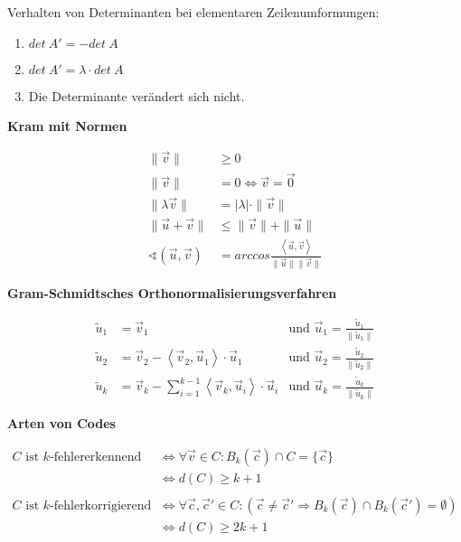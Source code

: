 \documentclass[10pt,fleqn, a4paper]{article}
\begin{document}
Verhalten von Determinanten bei elementaren Zeilenumformungen:

\begin{enumerate}
\item $det\ A'=-det\ A$
\item $det\ A'=\lambda\cdot det\ A$
\item Die Determinante verändert sich nicht.
\end{enumerate}

\vspace{1cm}

{\bf Kram mit Normen}

\begin{align*}
\|\vec v\|&\geq 0\\
\|\vec v\|&=0\Leftrightarrow\vec v=\vec 0\\
\|\lambda\vec v\|&=|\lambda|\cdot\|\vec v\|\\
\|\vec u+\vec v\|&\leq \|\vec v\|+\|\vec u\|\\
\sphericalangle (\vec u,\vec v)&=arccos\frac{\left<\vec u,\vec v\right>}{\|\vec u\|\|\vec v\|}
\end{align*}

\vspace{1cm}

{\bf Gram-Schmidtsches Orthonormalisierungsverfahren}

\begin{align*}
\tilde u_1&=\vec v_1 &\text{und }\vec u_1=\frac{\tilde u_1}{\|\tilde u_1\|}\\
\tilde u_2&=\vec v_2-\left<\vec v_2,\vec u_1\right>\cdot\vec u_1 &\text{und }\vec u_2=\frac{\tilde u_2}{\|\tilde u_2\|}\\
\tilde u_k&=\vec v_k-\sum^{k-1}_{i=1}\left<\vec v_k,\vec u_i\right>\cdot\vec u_i &\text{und }\vec u_k=\frac{\tilde u_k}{\|\tilde u_k\|}
\end{align*}

\vspace{1cm}

{\bf Arten von Codes}

\begin{align*}
C\text{ ist }k\text{-fehlererkennend}&\Leftrightarrow\forall\vec v\in C:B_k(\vec c)\cap C=\{\vec c\}\\
&\Leftrightarrow d(C)\geq k+1\\\\
C\text{ ist }k\text{-fehlerkorrigierend}&\Leftrightarrow\forall\vec c,\vec c'\in C:\left(\vec c\neq\vec c'\Rightarrow B_k(\vec c)\cap B_k(\vec c')=\emptyset\right)\\
&\Leftrightarrow d(C)\geq 2k+1
\end{align*}
\end{document}
